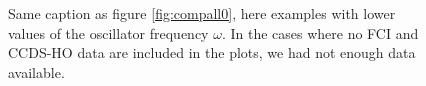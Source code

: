 \begin{figure}
\begin{center}
{}
\caption{Same caption as figure \ref{fig:compall0}, here examples with lower values of the oscillator frequency $\omega$. In the cases where no FCI and CCDS-HO data are included in the plots, we had not enough data available. }
\label{fig:compall2}
\end{center}
\end{figure}
